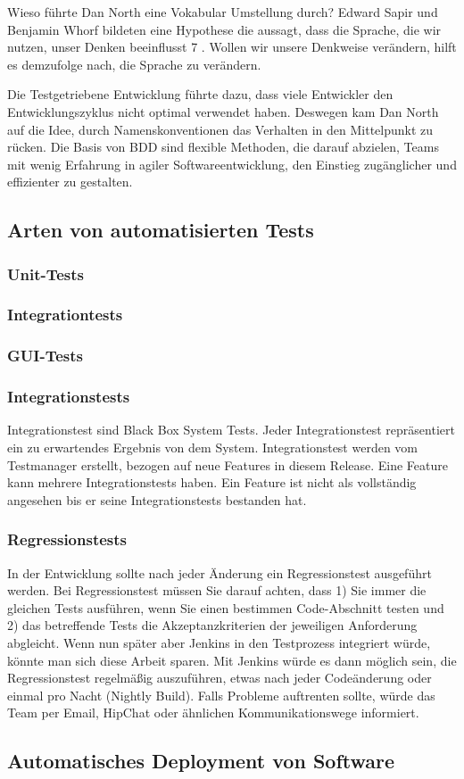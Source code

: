 Wieso führte Dan North eine Vokabular Umstellung durch? Edward Sapir und Benjamin Whorf bildeten eine Hypothese die aussagt, dass die Sprache, die wir nutzen, unser 
Denken beeinflusst 7 . Wollen wir unsere Denkweise verändern, hilft es demzufolge nach, die Sprache zu verändern.

Die Testgetriebene Entwicklung führte dazu, dass viele Entwickler den Entwicklungszyklus nicht optimal verwendet haben. Deswegen kam Dan North auf die Idee, durch
Namenskonventionen das Verhalten in den Mittelpunkt zu rücken. Die Basis von BDD sind flexible Methoden, die darauf abzielen, Teams mit wenig Erfahrung in agiler 
Softwareentwicklung, den Einstieg zugänglicher und effizienter zu gestalten.


\subsection{Arten von automatisierten Tests}\label{arten-von-tests} 
\subsubsection{Unit-Tests}

\subsubsection{Integrationtests}
\subsubsection{GUI-Tests}
\subsubsection{Integrationstests}
Integrationstest sind Black Box System Tests. Jeder Integrationstest repräsentiert ein zu erwartendes
Ergebnis von dem System. Integrationstest werden vom Testmanager erstellt, bezogen auf neue
Features in diesem Release. Eine Feature kann mehrere Integrationstests haben. Ein Feature ist nicht
als vollständig angesehen bis er seine Integrationstests bestanden hat. 

\subsubsection{Regressionstests}
In der Entwicklung sollte nach jeder Änderung ein Regressionstest ausgeführt werden. Bei Regressionstest
müssen Sie darauf achten, dass 1) Sie immer die gleichen Tests ausführen, wenn Sie einen
bestimmen Code-Abschnitt testen und 2) das betreffende Tests die Akzeptanzkriterien der jeweiligen
Anforderung abgleicht. Wenn nun später aber Jenkins in den Testprozess integriert würde, könnte
man sich diese Arbeit sparen. Mit Jenkins würde es dann möglich sein, die Regressionstest regelmäßig
auszuführen, etwas nach jeder Codeänderung oder einmal pro Nacht (Nightly Build). Falls Probleme auftrenten sollte, würde das Team per Email, HipChat oder ähnlichen Kommunikationswege informiert.



\subsection{Automatisches Deployment von Software}
